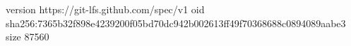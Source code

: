 version https://git-lfs.github.com/spec/v1
oid sha256:7365b32f898e4239200f05bd70dc942b002613ff49f70368688c0894089aabe3
size 87560
